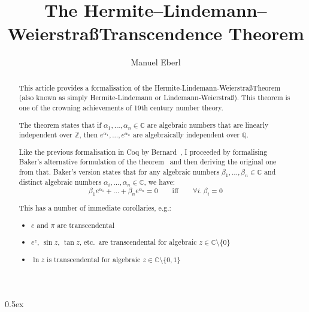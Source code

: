 \documentclass[11pt,a4paper]{article}
\begin{document}
\title{The Hermite--Lindemann--Weierstra\ss Transcendence Theorem}
\author{Manuel Eberl}
\maketitle

\begin{abstract}
This article provides a formalisation of the Her\-mite\--Lin\-de\-mann\--Wei\-er\-stra\ss Theorem
(also known as simply Her\-mite\--Lin\-de\-mann or Lin\-de\-mann\--Wei\-er\-stra\ss).
 This theorem is one of the crowning achievements of 19th century number theory.

The theorem states that if $\alpha_1, \ldots, \alpha_n\in\mathbb{C}$ are algebraic numbers that
are linearly independent over $\mathbb{Z}$, then $e^{\alpha_1},\ldots,e^{\alpha_n}$ are
algebraically independent over $\mathbb{Q}$.

Like the previous formalisation in Coq by Bernard~\cite{bernard}, I proceeded by formalising 
Baker's alternative formulation of the theorem~\cite{baker} and then deriving the original one from
that. Baker's version states that for any algebraic numbers
$\beta_1, \ldots, \beta_n\in\mathbb{C}$ and distinct algebraic numbers
$\alpha_i, \ldots, \alpha_n\in\mathbb{C}$, we have:
\[\beta_1 e^{\alpha_1} + \ldots + \beta_n e^{\alpha_n} = 0 \quad\quad\text{iff}\quad\quad
  \forall i.\ \beta_i = 0\]

This has a number of immediate corollaries, e.g.:
\begin{itemize}
\item $e$ and $\pi$ are transcendental
\item $e^z$, $\sin z$, $\tan z$, etc.\ are transcendental for algebraic $z\in\mathbb{C}\setminus\{0\}$
\item $\ln z$ is transcendental for algebraic $z\in\mathbb{C}\setminus\{0, 1\}$
\end{itemize}
\end{abstract}

\newpage
\tableofcontents
\newpage
\parindent 0pt\parskip 0.5ex



\nocite{baker}
\nocite{redheffer_steinberg}
\nocite{bernard}



\end{document}
